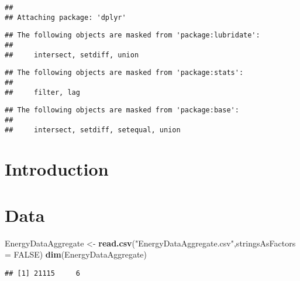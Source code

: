 \documentclass[
]{article}
\newenvironment{Shaded}{\begin{snugshade}}{\end{snugshade}}
\newcommand{\DataTypeTok}[1]{\textcolor[rgb]{0.13,0.29,0.53}{#1}}
\newcommand{\KeywordTok}[1]{\textcolor[rgb]{0.13,0.29,0.53}{\textbf{#1}}}
\newcommand{\NormalTok}[1]{#1}
\newcommand{\OperatorTok}[1]{\textcolor[rgb]{0.81,0.36,0.00}{\textbf{#1}}}
\newcommand{\OtherTok}[1]{\textcolor[rgb]{0.56,0.35,0.01}{#1}}
\newcommand{\StringTok}[1]{\textcolor[rgb]{0.31,0.60,0.02}{#1}}
\begin{document}
\begin{verbatim}
## 
## Attaching package: 'dplyr'
\end{verbatim}

\begin{verbatim}
## The following objects are masked from 'package:lubridate':
## 
##     intersect, setdiff, union
\end{verbatim}

\begin{verbatim}
## The following objects are masked from 'package:stats':
## 
##     filter, lag
\end{verbatim}

\begin{verbatim}
## The following objects are masked from 'package:base':
## 
##     intersect, setdiff, setequal, union
\end{verbatim}

\hypertarget{introduction}{%
\section{Introduction}\label{introduction}}

\hypertarget{data}{%
\section{Data}\label{data}}

\begin{Shaded}
\begin{Highlighting}[]
\NormalTok{EnergyDataAggregate <-}\StringTok{ }\KeywordTok{read.csv}\NormalTok{(}\StringTok{"EnergyDataAggregate.csv"}\NormalTok{,}\DataTypeTok{stringsAsFactors =} \OtherTok{FALSE}\NormalTok{)}
\KeywordTok{dim}\NormalTok{(EnergyDataAggregate)}
\end{Highlighting}
\end{Shaded}

\begin{verbatim}
## [1] 21115     6
\end{verbatim}

\begin{Shaded}
\end{Shaded}
\end{document}
